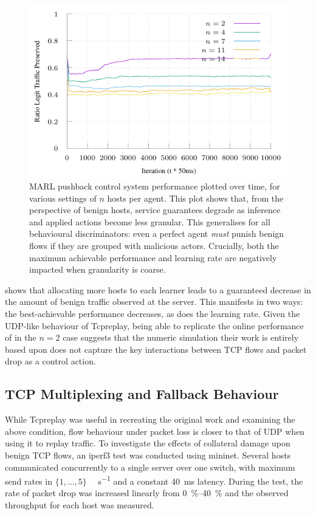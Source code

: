 \documentclass[conference, letterpaper, 10pt, times]{IEEEtran}
\begin{document}
\begin{figure}
	\includegraphics[width=\linewidth]{../plots/online-varyN-uneven}
	\caption{
		MARL pushback control system performance plotted over time, for various settings of $n$ hosts per agent.
		This plot shows that, from the perspective of benign hosts, service guarantees degrade as inference and applied actions become less granular.
		This generalises for all behavioural discriminators: even a perfect agent \emph{must} punish benign flows if they are grouped with malicious actors.
		Crucially, both the maximum achievable performance and learning rate are negatively impacted when granularity is coarse.
		\label{fig:marl-granularity}
	}
\end{figure}

 shows that allocating more hosts to each learner leads to a guaranteed decrease in the amount of benign traffic observed at the server.
This manifests in two ways: the best-achievable performance decreases, as does the learning rate.
Given the UDP-like behaviour of Tcpreplay, being able to replicate the online performance of \citeauthor{DBLP:journals/eaai/MalialisK15} in the $n=2$ case suggests that the numeric simulation their work is entirely based upon does not capture the key interactions between TCP flows and packet drop as a control action.

\subsection{TCP Multiplexing and Fallback Behaviour}
While Tcpreplay was useful in recreating the original work and examining the above condition, flow behaviour under packet loss is closer to that of UDP when using it to replay traffic.
To investigate the effects of collateral damage upon benign TCP flows, an iperf3 test was conducted using mininet.
Several hosts communicated concurrently to a single server over one switch, with maximum send rates in $\{1,...,5\}$ \si{\mega\bit\per\second} and a constant \SI{40}{\milli\second} latency.
During the test, the rate of packet drop was increased linearly from \SIrange{0}{40}{\percent} and the observed throughput for each host was measured.
\end{document}
